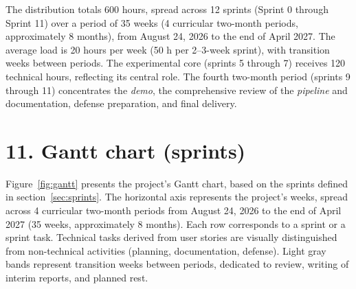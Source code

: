\documentclass[
  11pt, %
]{charter}
\begin{document}
The distribution totals 600 hours, spread across 12 sprints (Sprint 0 through Sprint 11) over a period of 35 weeks (4 curricular two-month periods, approximately 8 months), from August 24, 2026 to the end of April 2027. The average load is 20 hours per week (50 h per 2--3-week sprint), with transition weeks between periods. The experimental core (sprints 5 through 7) receives 120 technical hours, reflecting its central role. The fourth two-month period (sprints 9 through 11) concentrates the \textit{demo}, the comprehensive review of the \textit{pipeline} and documentation, defense preparation, and final delivery.

\section{11. Gantt chart (sprints)}
\label{sec:gantt}

Figure~\ref{fig:gantt} presents the project's Gantt chart, based on the sprints defined in section~\ref{sec:sprints}. The horizontal axis represents the project's weeks, spread across 4 curricular two-month periods from August 24, 2026 to the end of April 2027 (35 weeks, approximately 8 months). Each row corresponds to a sprint or a sprint task. Technical tasks derived from user stories are visually distinguished from non-technical activities (planning, documentation, defense). Light gray bands represent transition weeks between periods, dedicated to review, writing of interim reports, and planned rest.
\end{document}
